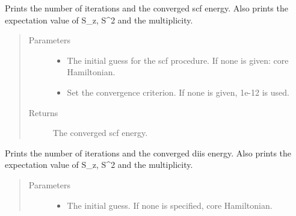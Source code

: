 \documentclass[letterpaper,10pt,english]{sphinxmanual}
\begin{document}
\begin{fulllineitems}
\begin{fulllineitems}
\end{fulllineitems}


\begin{fulllineitems}
\label{\detokenize{UHF:ghf.UHF.UHF.get_scf_solution}}
Prints the number of iterations and the converged scf energy.
Also prints the expectation value of S\_z, S\textasciicircum{}2 and the multiplicity.
\begin{quote}\begin{description}
\item[{Parameters}] \leavevmode\begin{itemize}
\item {} 
 \textendash{} The initial guess for the scf procedure. If none is given: core Hamiltonian.

\item {} 
 \textendash{} Set the convergence criterion. If none is given, 1e-12 is used.

\end{itemize}

\item[{Returns}] \leavevmode
The converged scf energy.

\end{description}\end{quote}

\end{fulllineitems}


\begin{fulllineitems}
\label{\detokenize{UHF:ghf.UHF.UHF.get_scf_solution_diis}}
Prints the number of iterations and the converged diis energy.
Also prints the expectation value of S\_z, S\textasciicircum{}2 and the multiplicity.
\begin{quote}\begin{description}
\item[{Parameters}] \leavevmode\begin{itemize}
\item {} 
 \textendash{} The initial guess. If none is specified, core Hamiltonian.


\end{itemize}
\end{description}
\end{quote}
\end{fulllineitems}
\end{fulllineitems}
\end{document}
